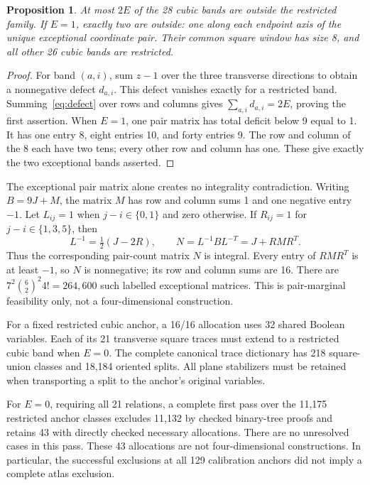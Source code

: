 \documentclass[11pt]{article}
\newtheorem{proposition}[theorem]{Proposition}
\theoremstyle{definition}
\begin{document}
\begin{proposition}\label{prop:excess}
At most $2E$ of the 28 cubic bands are outside the restricted family.
If $E=1$, exactly two are outside: one along each endpoint axis of the
unique exceptional coordinate pair. Their common square window has
size 8, and all other 26 cubic bands are restricted.
\end{proposition}
\begin{proof}
For band $(a,i)$, sum $z-1$ over the three transverse directions to
obtain a nonnegative defect $d_{a,i}$. This defect vanishes exactly for
a restricted band. Summing~\eqref{eq:defect} over rows and columns gives
$\sum_{a,i}d_{a,i}=2E$, proving the first assertion.
When $E=1$, one pair matrix has total deficit below 9 equal to 1. It has
one entry 8, eight entries 10, and forty entries 9. The row and column of
the 8 each have two tens; every other row and column has one. These give
exactly the two exceptional bands asserted.
\end{proof}

The exceptional pair matrix alone creates no integrality contradiction.
Writing $B=9J+M$, the matrix $M$ has row and column sums 1 and one negative
entry $-1$. Let $L_{ij}=1$ when $j-i\in\{0,1\}$ and zero otherwise.
If
$R_{ij}=1$ for $j-i\in\{1,3,5\}$, then
\[
 L^{-1}=\tfrac{1}{2}(J-2R),\qquad
 N=L^{-1}BL^{-T}=J+RMR^T.
\]
Thus the corresponding pair-count matrix $N$ is integral. Every entry
of $RMR^T$ is at least $-1$, so $N$ is nonnegative; its row and column
sums are 16. There are
$7^2\binom{6}{2}^2 4!=264,600$ such labelled exceptional matrices.
This is pair-marginal feasibility only, not a four-dimensional construction.

For a fixed restricted cubic anchor, a 16/16 allocation uses 32 shared
Boolean variables. Each of its 21 transverse square traces must extend
to a restricted cubic band when $E=0$. The complete canonical trace
dictionary has 218 square-union classes and 18,184 oriented splits.
All plane stabilizers must be retained when transporting a split to
the anchor's original variables.

For $E=0$, requiring all 21 relations,
a complete first pass over the 11,175 restricted anchor classes
excludes 11,132 by checked binary-tree proofs
and retains 43 with directly checked necessary allocations. There are
no unresolved cases in this pass. These 43 allocations are not
four-dimensional constructions. In particular, the successful exclusions
at all 129 calibration anchors did not imply a complete atlas exclusion.
\end{document}
